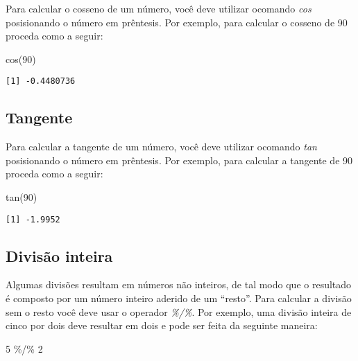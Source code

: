 \documentclass[
  letterpaper,
  DIV=11,
  numbers=noendperiod]{scrreprt}
\newenvironment{Shaded}{\begin{snugshade}}{\end{snugshade}}
\newcommand{\DecValTok}[1]{\textcolor[rgb]{0.68,0.00,0.00}{#1}}
\newcommand{\FunctionTok}[1]{\textcolor[rgb]{0.28,0.35,0.67}{#1}}
\newcommand{\NormalTok}[1]{\textcolor[rgb]{0.00,0.23,0.31}{#1}}
\newcommand{\SpecialCharTok}[1]{\textcolor[rgb]{0.37,0.37,0.37}{#1}}
\begin{document}
Para calcular o cosseno de um número, você deve utilizar ocomando
\emph{cos} posisionando o número em prêntesis. Por exemplo, para
calcular o cosseno de 90 proceda como a seguir:

\begin{Shaded}
\begin{Highlighting}[]
\FunctionTok{cos}\NormalTok{(}\DecValTok{90}\NormalTok{)}
\end{Highlighting}
\end{Shaded}

\begin{verbatim}
[1] -0.4480736
\end{verbatim}

\subsection{Tangente}\label{tangente}

Para calcular a tangente de um número, você deve utilizar ocomando
\emph{tan} posisionando o número em prêntesis. Por exemplo, para
calcular a tangente de 90 proceda como a seguir:

\begin{Shaded}
\begin{Highlighting}[]
\FunctionTok{tan}\NormalTok{(}\DecValTok{90}\NormalTok{)}
\end{Highlighting}
\end{Shaded}

\begin{verbatim}
[1] -1.9952
\end{verbatim}

\subsection{Divisão inteira}\label{divisuxe3o-inteira}

Algumas divisões resultam em números não inteiros, de tal modo que o
resultado é composto por um número inteiro aderido de um ``resto''. Para
calcular a divisão sem o resto você deve usar o operador \emph{\%/\%}.
Por exemplo, uma divisão inteira de cinco por dois deve resultar em dois
e pode ser feita da seguinte maneira:

\begin{Shaded}
\begin{Highlighting}[]
\DecValTok{5} \SpecialCharTok{\%/\%} \DecValTok{2}
\end{Highlighting}
\end{Shaded}
\end{document}

